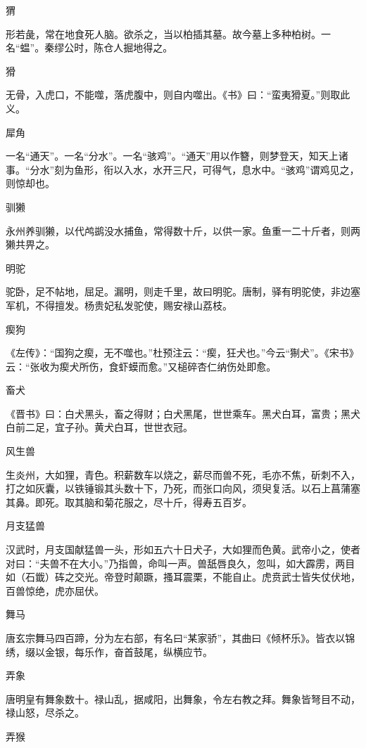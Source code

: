 \documentclass[a4paper,12pt,UTF8,twoside]{ctexbook}
\begin{document}
    猬
    
    形若彘，常在地食死人脑。欲杀之，当以柏插其墓。故今墓上多种柏树。一名“蝹”。秦缪公时，陈仓人掘地得之。
    
    猾
    
    无骨，入虎口，不能噬，落虎腹中，则自内噬出。《书》曰：“蛮夷猾夏。”则取此义。
    
    犀角
    
    一名“通天”。一名“分水”。一名“骇鸡”。“通天”用以作簪，则梦登天，知天上诸事。“分水”刻为鱼形，衔以入水，水开三尺，可得气，息水中。“骇鸡”谓鸡见之，则惊却也。
    
    驯獭
    
    永州养驯獭，以代鸬鹚没水捕鱼，常得数十斤，以供一家。鱼重一二十斤者，则两獭共畀之。
    
    明驼
    
    驼卧，足不帖地，屈足。漏明，则走千里，故曰明驼。唐制，驿有明驼使，非边塞军机，不得擅发。杨贵妃私发驼使，赐安禄山荔枝。
    
    瘈狗
    
    《左传》：“国狗之瘈，无不噬也。”杜预注云：“瘈，狂犬也。”今云“猘犬”。《宋书》云：“张收为瘈犬所伤，食虾蟆而愈。”又槌碎杏仁纳伤处即愈。
    
    畜犬
    
    《晋书》曰：白犬黑头，畜之得财；白犬黑尾，世世乘车。黑犬白耳，富贵；黑犬白前二足，宜子孙。黄犬白耳，世世衣冠。
    
    风生兽
    
    生炎州，大如狸，青色。积薪数车以烧之，薪尽而兽不死，毛亦不焦，斫刺不入，打之如灰囊，以铁锤锻其头数十下，乃死，而张口向风，须臾复活。以石上菖蒲塞其鼻。即死。取其脑和菊花服之，尽十斤，得寿五百岁。
    
    月支猛兽
    
    汉武时，月支国献猛兽一头，形如五六十日犬子，大如狸而色黄。武帝小之，使者对曰：“夫兽不在大小。”乃指兽，命叫一声。兽舐唇良久，忽叫，如大霹雳，两目如（石韱）砗之交光。帝登时颠蹶，搔耳震栗，不能自止。虎贲武士皆失仗伏地，百兽惊绝，虎亦屈伏。
    
    舞马
    
    唐玄宗舞马四百蹄，分为左右部，有名曰“某家骄”，其曲曰《倾杯乐》。皆衣以锦绣，缀以金银，每乐作，奋首鼓尾，纵横应节。
    
    弄象
    
    唐明皇有舞象数十。禄山乱，据咸阳，出舞象，令左右教之拜。舞象皆弩目不动，禄山怒，尽杀之。
    
    弄猴
    
\end{document}
